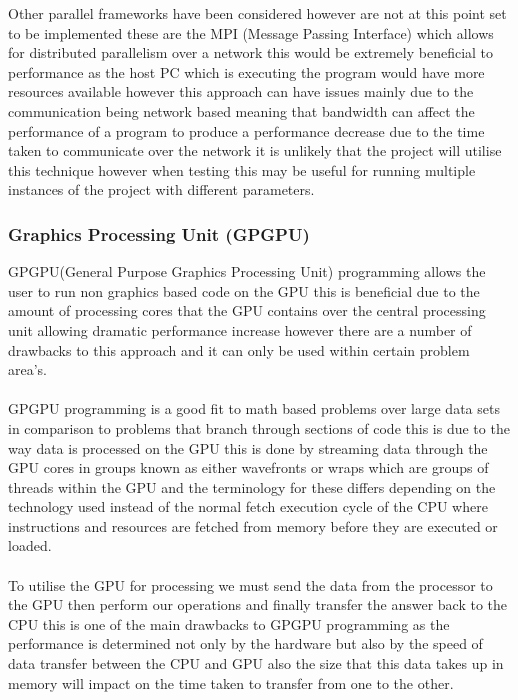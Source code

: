 Other parallel frameworks have been considered however are not at this point set to be implemented these are the MPI (Message Passing Interface)\cite{mpi} which allows for distributed parallelism over a network this would be extremely beneficial to performance as the host PC which is executing the program would have more resources available however this approach can have issues mainly due to the communication being network based meaning that bandwidth can affect the performance of a program to produce a performance decrease due to the time taken to communicate over the network it is unlikely that the project will utilise this technique however when testing this may be useful for running multiple instances of the project with different parameters. 

\subsubsection{Graphics Processing Unit (GPGPU)}
GPGPU(General Purpose Graphics Processing Unit) programming allows the user to run non graphics based code on the GPU this is beneficial due to the amount of processing cores that the GPU contains over the central processing unit allowing dramatic performance increase however there are a number of drawbacks to this approach and it can only be used within certain problem area's.\\\\ GPGPU programming is a good fit to math based problems over large data sets in comparison to problems that branch through sections of code this is due to the way data is processed on the GPU this is done by streaming data through the GPU cores in groups known as either wavefronts or wraps which are groups of threads within the GPU and the terminology for these differs depending on the technology used instead of the normal fetch execution cycle of the CPU where instructions and resources are fetched from memory before they are executed or loaded.\\\\ To utilise the GPU for processing we must send the data from the processor to the GPU then perform our operations and finally transfer the answer back to the CPU this is one of the main drawbacks to GPGPU programming as the performance is determined not only by the hardware but also by the speed of data transfer between the CPU and GPU also the size that this data takes up in memory will impact on the time taken to transfer from one to the other.\\    

